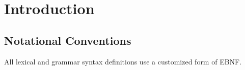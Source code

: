 
\chapter{Introduction}

\minitoc

\newpage






\section{Notational Conventions}

All lexical and grammar syntax definitions use a customized form of EBNF. 

